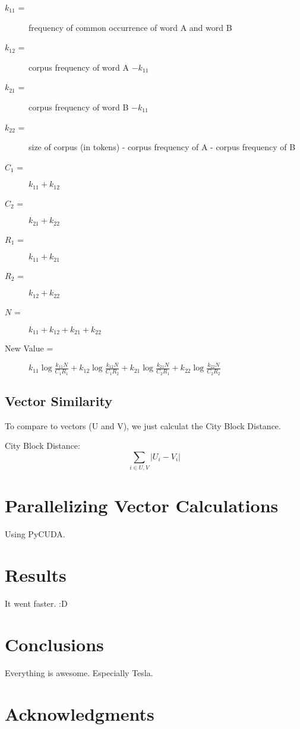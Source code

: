 \documentclass[12pt]{article}
\begin{document}
\begin{description}
\item[$k_{11}$ =] frequency of common occurrence of word A and word B
\item[$k_{12}$ =] corpus frequency of word A $- k_{11}$
\item[$k_{21}$ =] corpus frequency of word B $- k_{11}$
\item[$k_{22}$ =] size of corpus (in tokens) - corpus frequency of A - corpus frequency of B
\item[$C_1$ =] $k_{11} + k_{12}$
\item[$C_2$ =] $k_{21} + k_{22}$
\item[$R_1$ =] $k_{11} + k_{21}$
\item[$R_2$ =] $k_{12} + k_{22}$
\item[$N$ =] $k_{11} + k_{12} + k_{21} + k_{22}$
\item[New Value = ]
    $k_{11}\log\frac{k_{11}N}{C_1R_1} +
    k_{12}\log\frac{k_{12}N}{C_1R_2} +
    k_{21}\log\frac{k_{21}N}{C_2R_1} +
    k_{22}\log\frac{k_{22}N}{C_2R_2}$
\end{description}


\subsection{Vector Similarity}

To compare to vectors (U and V), we just calculat the City Block Distance.

City Block Distance:
$$\sum_{i\in U,V} |U_i - V_i| $$

\section{Parallelizing Vector Calculations}

Using PyCUDA. %

\section{Results}

It went faster. :D %


\section{Conclusions}
Everything is awesome. Especially Tesla.

\section{Acknowledgments}



\end{document}

